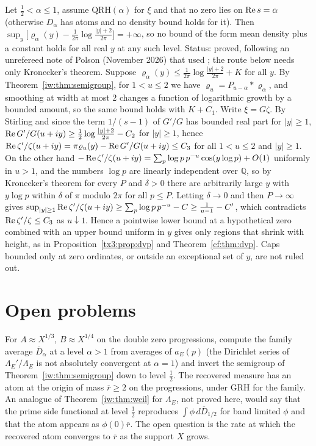 \begin{remark}\label{iw:rem:nocap}
Let $\frac12<\alpha\le1$, assume $\mathrm{QRH}(\alpha)$ for $\xi$ and that no zero lies on $\operatorname{Re} s=\alpha$ (otherwise $D_\alpha$ has atoms and no density bound holds for it). Then $\sup_y\big[\varrho_\alpha(y)-\frac1{2\pi}\log\frac{|y|+2}{2\pi}\big]=+\infty$, so no bound of the form mean density plus a constant holds for all real $y$ at any such level. Status: proved, following an unrefereed note of Polson (November 2026) that used \cite{BohrCourant}; the route below needs only Kronecker's theorem. Suppose $\varrho_\alpha(y)\le\frac1{2\pi}\log\frac{|y|+2}{2\pi}+K$ for all $y$. By Theorem~\ref{iw:thm:semigroup}, for $1<u\le2$ we have $\varrho_u=P_{u-\alpha}*\varrho_\alpha$, and smoothing at width at most $2$ changes a function of logarithmic growth by a bounded amount, so the same bound holds with $K+C_1$. Write $\xi=G\zeta$. By Stirling and since the term $1/(s-1)$ of $G'/G$ has bounded real part for $|y|\ge1$, $\operatorname{Re} G'/G(u+iy)\ge\frac12\log\frac{|y|+2}{2\pi}-C_2$ for $|y|\ge1$, hence $\operatorname{Re}\zeta'/\zeta(u+iy)=\pi\varrho_u(y)-\operatorname{Re} G'/G(u+iy)\le C_3$ for all $1<u\le2$ and $|y|\ge1$. On the other hand $-\operatorname{Re}\zeta'/\zeta(u+iy)=\sum_p\log p\,p^{-u}\cos(y\log p)+O(1)$ uniformly in $u>1$, and the numbers $\log p$ are linearly independent over $\mathbb Q$, so by Kronecker's theorem for every $P$ and $\delta>0$ there are arbitrarily large $y$ with $y\log p$ within $\delta$ of $\pi$ modulo $2\pi$ for all $p\le P$. Letting $\delta\to0$ and then $P\to\infty$ gives $\sup_{|y|\ge1}\operatorname{Re}\zeta'/\zeta(u+iy)\ge\sum_p\log p\,p^{-u}-C\ge\frac1{u-1}-C'$, which contradicts $\operatorname{Re}\zeta'/\zeta\le C_3$ as $u\downarrow1$. Hence a pointwise lower bound at a hypothetical zero combined with an upper bound uniform in $y$ gives only regions that shrink with height, as in Proposition~\ref{tx3:prop:dvp} and Theorem~\ref{cf:thm:dvp}. Caps bounded only at zero ordinates, or outside an exceptional set of $y$, are not ruled out.
\end{remark}

\section{Open problems}\label{iw:sec:open}

\begin{problem}\label{iw:prob:family}
For $A\approx X^{1/3}$, $B\approx X^{1/4}$ on the double zero progressions, compute the family average $\overline D_\alpha$ at a level $\alpha>1$ from averages of $a_E(p)$ (the Dirichlet series of $\Lambda_E'/\Lambda_E$ is not absolutely convergent at $\alpha=1$) and invert the semigroup of Theorem~\ref{iw:thm:semigroup} down to level $\frac12$. The recovered measure has an atom at the origin of mass $\overline r\ge2$ on the progressions, under GRH for the family. An analogue of Theorem~\ref{iw:thm:weil} for $\Lambda_E$, not proved here, would say that the prime side functional at level $\frac12$ reproduces $\int\phi\,d\overline D_{1/2}$ for band limited $\phi$ and that the atom appears as $\phi(0)\overline r$. The open question is the rate at which the recovered atom converges to $\overline r$ as the support $X$ grows.
\end{problem}
